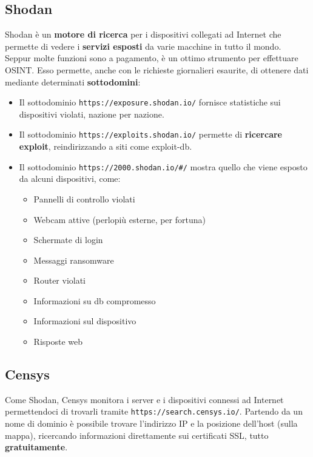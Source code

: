 \documentclass{article}
\begin{document}
\subsection{Shodan}
Shodan è un \textbf{motore di ricerca} per i dispositivi collegati ad Internet che permette di vedere i \textbf{servizi esposti} da varie macchine in tutto il mondo.\\
Seppur molte funzioni sono a pagamento, è un ottimo strumento per effettuare OSINT. Esso permette, anche con le richieste giornalieri esaurite, di ottenere dati mediante determinati \textbf{sottodomini}:
\begin{itemize}
    \item Il sottodominio \verb|https://exposure.shodan.io/| fornisce statistiche sui dispositivi violati, nazione per nazione.
    
    \item Il sottodominio \verb|https://exploits.shodan.io/| permette di \textbf{ricercare exploit}, reindirizzando a siti come exploit-db.
    \newpage
    \item Il sottodominio \verb|https://2000.shodan.io/#/| mostra quello che viene esposto da alcuni dispositivi, come:
    \begin{itemize}
        \item Pannelli di controllo violati
        \item Webcam attive (perlopiù esterne, per fortuna)
        \item Schermate di login
        \item Messaggi ransomware
        \item Router violati
        \item Informazioni su db compromesso
        \item Informazioni sul dispositivo
        \item Risposte web
    \end{itemize}
\end{itemize}

\subsection{Censys}
Come Shodan, Censys monitora i server e i dispositivi connessi ad Internet permettendoci di trovarli tramite \verb|https://search.censys.io/|. 
Partendo da un nome di dominio è possibile trovare l'indirizzo IP e la posizione dell'host (sulla mappa), ricercando informazioni direttamente sui certificati SSL, tutto \textbf{gratuitamente}.
\end{document}
